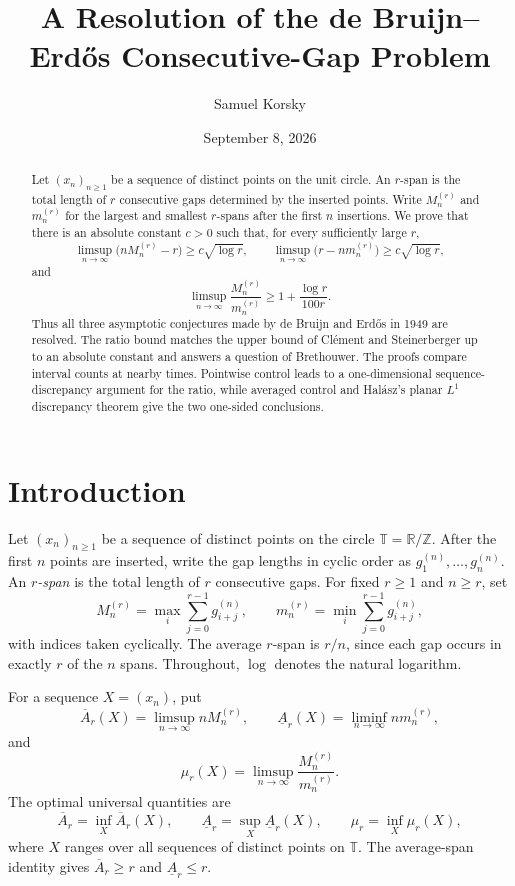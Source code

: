 \documentclass[11pt]{article}
\title{A Resolution of the de Bruijn--Erd\H{o}s Consecutive-Gap Problem}
\author{Samuel Korsky}
\date{September 8, 2026}
\theoremstyle{remark}
\numberwithin{equation}{section}
\newcommand{\T}{\mathbb{T}}
\newcommand{\R}{\mathbb{R}}
\begin{document}
\maketitle
\begin{abstract}
\noindent
Let $(x_n)_{n\geq1}$ be a sequence of distinct points on the unit circle.
An $r$-span is the total length of $r$ consecutive gaps determined by the
inserted points. Write $M_n^{(r)}$ and $m_n^{(r)}$ for the largest and smallest
$r$-spans after the first $n$ insertions. We prove that there is an absolute
constant $c>0$ such that, for every sufficiently large $r$,
\[
  \limsup_{n\to\infty}\bigl(nM_n^{(r)}-r\bigr)
  \geq c\sqrt{\log r},
  \qquad
  \limsup_{n\to\infty}\bigl(r-nm_n^{(r)}\bigr)
  \geq c\sqrt{\log r},
\]
and
\[
  \limsup_{n\to\infty}\frac{M_n^{(r)}}{m_n^{(r)}}
  \geq 1+\frac{\log r}{100r}.
\]
Thus all three asymptotic conjectures made by de Bruijn and Erd\H{o}s in
1949 are resolved. The ratio bound matches the upper bound of Cl\'ement and
Steinerberger up to an absolute constant and answers a question of
Brethouwer. The proofs compare interval counts at nearby times. Pointwise
control leads to a one-dimensional sequence-discrepancy argument for the
ratio, while averaged control and Hal\'asz's planar $L^1$ discrepancy theorem
give the two one-sided conclusions.
\end{abstract}
\section{Introduction}
Let $(x_n)_{n\geq1}$ be a sequence of distinct points on the circle
$\T=\R/\mathbb{Z}$. After the first $n$ points are inserted, write the gap
lengths in cyclic order as $g_1^{(n)},\ldots,g_n^{(n)}$. An \emph{$r$-span}
is the total length of $r$ consecutive gaps. For fixed $r\geq1$ and $n\geq r$,
set
\[
  M_n^{(r)}=\max_i\sum_{j=0}^{r-1}g_{i+j}^{(n)},
  \qquad
  m_n^{(r)}=\min_i\sum_{j=0}^{r-1}g_{i+j}^{(n)},
\]
with indices taken cyclically. The average $r$-span is $r/n$, since each
gap occurs in exactly $r$ of the $n$ spans. Throughout, $\log$ denotes the
natural logarithm.

For a sequence $X=(x_n)$, put
\[
  \overline A_r(X)=\limsup_{n\to\infty}nM_n^{(r)},
  \qquad
  \underline A_r(X)=\liminf_{n\to\infty}nm_n^{(r)},
\]
and
\[
  \mu_r(X)=\limsup_{n\to\infty}
  \frac{M_n^{(r)}}{m_n^{(r)}}.
\]
The optimal universal quantities are
\[
  \overline A_r=\inf_X\overline A_r(X),
  \qquad
  \underline A_r=\sup_X\underline A_r(X),
  \qquad
  \mu_r=\inf_X\mu_r(X),
\]
where $X$ ranges over all sequences of distinct points on $\T$.
The average-span identity gives $\overline A_r\geq r$ and
$\underline A_r\leq r$.
\end{document}
